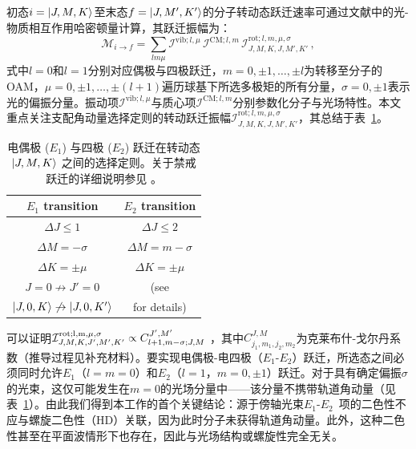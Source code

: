 \documentclass[reprint,aps,prl,twocolumn,superscriptaddress,groupedaddress]{revtex4-2}
\newcommand{\eoet}{$E_1$-$E_2$}
\begin{document}
\begin{CJK*}{UTF8}{gbsn}
初态$i=\ket{J,M,K}$至末态$f=\ket{J,M',K'}$的分子转动态跃迁速率可通过文献\cite{Maslov2024,Maslov_Thesis}中的光-物质相互作用哈密顿量计算，其跃迁振幅为：
\begin{equation}
    \mathcal{M}_{i\to f}=\sum_{lm\mu}\mathcal{I}^{\text{vib}; l,\mu}\,\mathcal{I}^{\text{CM}; l,m}\,\mathcal{I}^{\text{rot}; l,m,\mu,\sigma}_{J,M,K,J,M',K'}\,,
    \label{eq_transition_matrix}
\end{equation}
式中$l=0$和$l=1$分别对应偶极与四极跃迁，$m = 0, \pm 1, \dots, \pm l$为转移至分子的OAM，$\mu = 0, \pm 1, \dots, \pm (l+1)$遍历球基下所选多极矩的所有分量，$\sigma =0, \pm 1$表示光的偏振分量。振动项$\mathcal{I}^{\text{vib}; l,\mu}$与质心项$\mathcal{I}^{\text{CM}; l,m}$分别参数化分子与光场特性。本文重点关注支配角动量选择定则的转动跃迁振幅$\mathcal{I}^{\text{rot};l,m,\mu,\sigma}_{J,M,K,J,M',K'}$，其总结于表~\ref{SelectionRules}。
\begin{table}[ht!]
    \centering
    \begin{tabular}{c c}\hline
    \toprule
        \textbf{$E_1$ transition} & \textbf{$E_2$ transition}  \\
        \midrule
        $\Delta J\leq 1$ &  $\Delta J\leq 2$ \\
        $\Delta M=-\sigma$ & $\Delta M=m-\sigma$ \\
        $\Delta K=\pm\mu$ & $\Delta K=\pm\mu$ \\
        $J=0\not\to J'=0$ &  (see \cite{Note1}\\
        $\ket{J,0,K}\not\to\ket{J,0,K'}$ &  for details)\\
    \bottomrule
\hline
    \end{tabular}
    \caption{电偶极 ($E_1$) 与四极 ($E_2$) 跃迁在转动态 $\ket{J,M,K}$ 之间的选择定则。关于禁戒跃迁的详细说明参见 \cite{Note1}。}
    \label{SelectionRules}
\end{table}
可以证明$\mathcal{I}^{\rm rot; l, m, \mu, \sigma}_{J, M, K, J', M', K'} \propto C^{J',M'}_{l+1, m-\sigma; J, M}$ \cite{Maslov2024,Maslov_Thesis}，其中$C^{J, M}_{j_1, m_1, j_2, m_2}$为克莱布什-戈尔丹系数（推导过程见补充材料\cite{Note1}）。要实现电偶极-电四极（\eoet）跃迁，所选态之间必须同时允许$E_1$（$l=m=0$）和$E_2$（$l = 1$，$m = 0, \pm 1$）跃迁。对于具有确定偏振$\sigma$的光束，这仅可能发生在$m = 0$的光场分量中——该分量不携带轨道角动量（见表~\ref{SelectionRules}）。由此我们得到本工作的首个关键结论：源于傍轴光束\eoet~项的二色性不应与螺旋二色性（HD）关联，因为此时分子未获得轨道角动量。此外，这种二色性甚至在平面波情形下也存在，因此与光场结构或螺旋性完全无关。


\end{CJK*}
\end{document}
